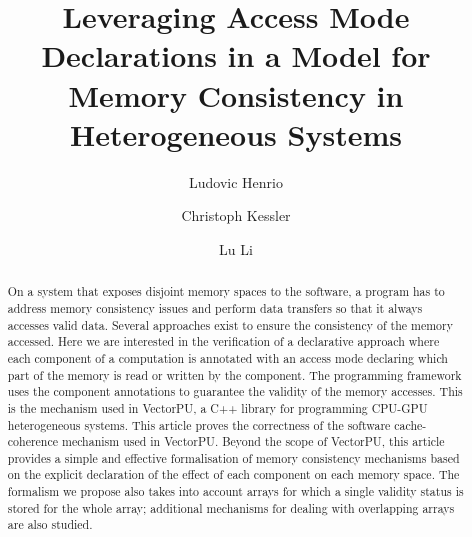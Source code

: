 \documentclass[preprint,12pt]{elsarticle}
\begin{document}
\begin{frontmatter}


\title{Leveraging Access Mode 
Declarations in a Model for Memory Consistency in Heterogeneous Systems }


\author[i3s]{Ludovic Henrio}
\author[liu]{Christoph Kessler}
\author[liu]{Lu Li}

\address[i3s]{Universit\'e~C\^ote~d'Azur, CNRS, I3S, France.}
\address[liu]{University of Linköping, Sweden}

\begin{abstract}
On a system that exposes disjoint memory spaces to the software, a program has to address memory consistency 
issues and perform data transfers so that it always accesses valid  
data. Several approaches exist to ensure the consistency of the memory accessed. Here we 
are interested in the verification of a declarative approach where each component of 
a computation is annotated with an access mode declaring which part of the memory is 
read or written by the component. The programming framework uses the component
annotations to guarantee the validity of the memory accesses. This is the mechanism used in VectorPU, a C++ library for programming CPU-GPU heterogeneous  systems. 
This article proves the correctness of the software cache-coherence mechanism used in VectorPU. 
Beyond the scope of VectorPU, this article provides a simple and effective formalisation of memory consistency mechanisms based on the explicit declaration of the effect of each component on each memory space. 
The formalism we propose also takes into account arrays for which a single validity status is stored for the whole array; additional mechanisms for dealing with overlapping arrays are also studied. 


\end{abstract}
\end{frontmatter}
\end{document}
